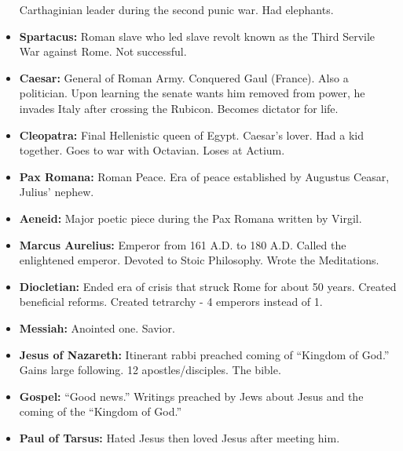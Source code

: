\documentclass[crop=false,class=book]{standalone}
\begin{document}
\begin{itemize}[noitemsep]
                    Carthaginian leader during the second punic war.
                    Had elephants.
                \item \textbf{Spartacus:}
                    Roman slave who led slave revolt known as the
                    Third Servile War against Rome. Not successful.
                \item \textbf{Caesar:}
                    General of Roman Army. Conquered Gaul (France).
                    Also a politician. Upon learning the senate
                    wants him removed from power, he invades
                    Italy after crossing the Rubicon.
                    Becomes dictator for life.
                \item \textbf{Cleopatra:}
                    Final Hellenistic queen of Egypt. Caesar’s
                    lover. Had a kid together. Goes to war
                    with Octavian.
                    Loses at Actium.
                \item \textbf{Pax Romana:}
                    Roman Peace. Era of peace established by
                    Augustus Ceasar, Julius’ nephew.
                \item \textbf{Aeneid:}
                    Major poetic piece during the Pax Romana
                    written by Virgil.
                \item \textbf{Marcus Aurelius:}
                    Emperor from 161 A.D. to 180 A.D. Called the
                    enlightened emperor. Devoted to Stoic
                    Philosophy. Wrote the Meditations.
                \item \textbf{Diocletian:}
                    Ended era of crisis that struck Rome for about
                    50 years. Created beneficial reforms. Created
                    tetrarchy - 4 emperors instead of 1.
                \item \textbf{Messiah:}
                    Anointed one. Savior. 
                \item \textbf{Jesus of Nazareth:}
                    Itinerant rabbi preached coming of
                    ``Kingdom of God.'' Gains large following.
                    12 apostles/disciples. The bible.
                \item \textbf{Gospel:}
                    ``Good news.'' Writings preached by Jews about
                    Jesus and the coming of the ``Kingdom of God.''
                \item \textbf{Paul of Tarsus:}
                    Hated Jesus then loved Jesus after meeting him.

\end{itemize}
\end{document}
